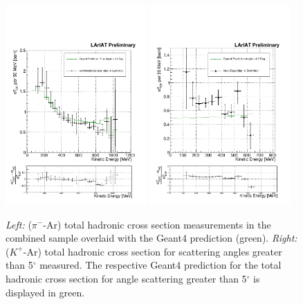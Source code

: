 \begin{figure}[htb]
\centering
\includegraphics[width=0.48\textwidth]{Chapter-6/Images/TheRealMoneyPlot.pdf}
\includegraphics[width=0.48\textwidth]{Chapter-7/Images/TheMoneyPlotK.pdf}
\caption{\emph{Left:} ($\pi^-$-Ar) total hadronic cross section measurements in the combined sample overlaid with the  Geant4 prediction (green). \emph{Right:} ($K^+$-Ar) total hadronic cross section for  scattering angles greater than 5$^\circ$ measured. The respective Geant4 prediction for the total hadronic cross section for angle scattering greater than 5$^\circ$ is displayed in green. } 
\label{fig:finalfinal}
\end{figure}



